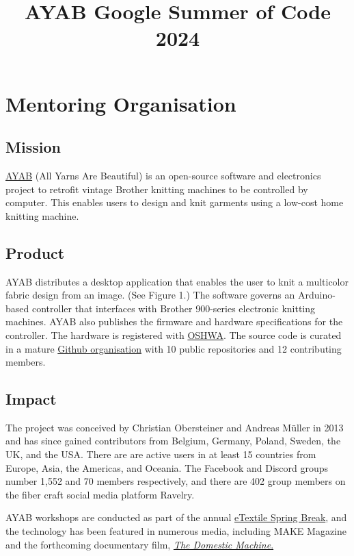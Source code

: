 \documentclass{article}
\title{AYAB Google Summer of Code 2024}
\author{\color{red}{\textbf{Application Deadline: Feb 6, 2024}}}
\begin{document}
\maketitle

\section{Mentoring Organisation}

\subsection{Mission}

\href{https://ayab-knitting.com/}{AYAB} (All Yarns Are Beautiful) is an open-source software and electronics project to retrofit vintage Brother knitting machines to be controlled by computer. This enables users to design and knit garments using a low-cost home knitting machine.

\subsection{Product}

AYAB distributes a desktop application that enables the user to knit a multicolor fabric design from an image. (See Figure 1.) The software governs an Arduino-based controller that interfaces with Brother 900-series electronic knitting machines. AYAB also publishes the firmware and hardware specifications for the controller. The hardware is registered with \href{https://certification.oshwa.org/us002598.html}{OSHWA}. The source code is curated in a mature \href{https://github.com/AllYarnsAreBeautiful}{Github organisation} with 10 public repositories and 12 contributing members.

\subsection{Impact}

The project was conceived by Christian Obersteiner and Andreas M{\"u}ller in 2013 and has since gained contributors from Belgium, Germany, Poland, Sweden, the UK, and the USA. There are are active users in at least 15 countries from Europe, Asia, the Americas, and Oceania. The Facebook and Discord groups number 1,552 and 70 members respectively, and there are 402 group members on the fiber craft social media platform Ravelry.

AYAB workshops are conducted as part of the annual \href{http://etextilespringbreak.org/}{eTextile Spring Break}, and the technology has been featured in numerous media, including MAKE Magazine and the forthcoming documentary film, \href{https://www.thedomesticmachine.com/}{\textit{The Domestic Machine}.}
\end{document}
